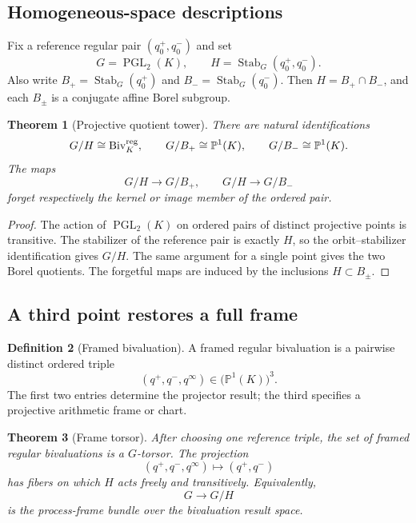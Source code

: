 \documentclass[11pt]{article}
\newtheorem{theorem}{Theorem}[section]
\theoremstyle{definition}
\newtheorem{definition}[theorem]{Definition}
\theoremstyle{remark}
\newcommand{\PGL}{\operatorname{PGL}}
\newcommand{\Biv}{\operatorname{Biv}}
\newcommand{\Stab}{\operatorname{Stab}}
\newcommand{\PP}{\mathbb P}
\begin{document}
\subsection{Homogeneous-space descriptions}

Fix a reference regular pair \((q_0^+,q_0^-)\) and set
\[
G=\PGL_2(K),
\qquad
H=\Stab_G(q_0^+,q_0^-).
\]
Also write \(B_+=\Stab_G(q_0^+)\) and
\(B_-=\Stab_G(q_0^-)\).  Then \(H=B_+\cap B_-\), and each \(B_\pm\) is a
conjugate affine Borel subgroup.

\begin{theorem}[Projective quotient tower]
\label{thm:quotient-tower}
There are natural identifications
\[
G/H\cong\Biv_K^{\rm reg},
\qquad
G/B_+\cong\PP^1(K),
\qquad
G/B_-\cong\PP^1(K).
\]
The maps
\[
G/H\longrightarrow G/B_+,
\qquad
G/H\longrightarrow G/B_-
\]
forget respectively the kernel or image member of the ordered pair.
\end{theorem}

\begin{proof}
The action of \(\PGL_2(K)\) on ordered pairs of distinct projective points is
transitive.  The stabilizer of the reference pair is exactly \(H\), so the
orbit--stabilizer identification gives \(G/H\).  The same argument for a
single point gives the two Borel quotients.  The forgetful maps are induced by
the inclusions \(H\subset B_\pm\).
\end{proof}

\subsection{A third point restores a full frame}

\begin{definition}[Framed bivaluation]
A framed regular bivaluation is a pairwise distinct ordered triple
\[
(q^+,q^-,q^\infty)\in\bigl(\PP^1(K)\bigr)^3.
\]
The first two entries determine the projector result; the third specifies a
projective arithmetic frame or chart.
\end{definition}

\begin{theorem}[Frame torsor]
\label{thm:frame-torsor}
After choosing one reference triple, the set of framed regular bivaluations is
a \(G\)-torsor.  The projection
\[
(q^+,q^-,q^\infty)\longmapsto(q^+,q^-)
\]
has fibers on which \(H\) acts freely and transitively.  Equivalently,
\[
G\longrightarrow G/H
\]
is the process-frame bundle over the bivaluation result space.
\end{theorem}
\end{document}

